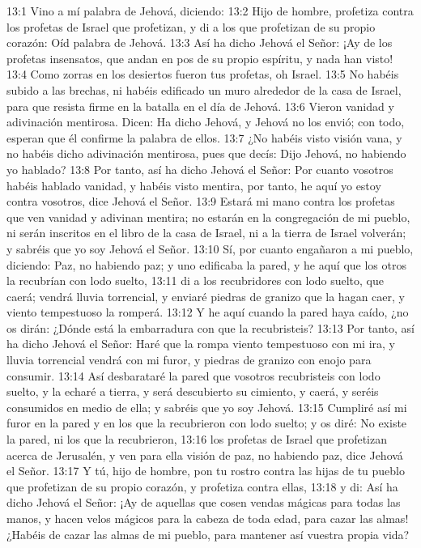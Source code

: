 13:1 Vino a mí palabra de Jehová, diciendo:   
13:2 Hijo de hombre, profetiza contra los profetas de Israel que profetizan, y di a los que profetizan de su propio corazón: Oíd palabra de Jehová.   
13:3 Así ha dicho Jehová el Señor: ¡Ay de los profetas insensatos, que andan en pos de su propio espíritu, y nada han visto!   
13:4 Como zorras en los desiertos fueron tus profetas, oh Israel.   
13:5 No habéis subido a las brechas, ni habéis edificado un muro alrededor de la casa de Israel, para que resista firme en la batalla en el día de Jehová.   
13:6 Vieron vanidad y adivinación mentirosa. Dicen: Ha dicho Jehová, y Jehová no los envió; con todo, esperan que él confirme la palabra de ellos.   
13:7 ¿No habéis visto visión vana, y no habéis dicho adivinación mentirosa, pues que decís: Dijo Jehová, no habiendo yo hablado?   
13:8 Por tanto, así ha dicho Jehová el Señor: Por cuanto vosotros habéis hablado vanidad, y habéis visto mentira, por tanto, he aquí yo estoy contra vosotros, dice Jehová el Señor.   
13:9 Estará mi mano contra los profetas que ven vanidad y adivinan mentira; no estarán en la congregación de mi pueblo, ni serán inscritos en el libro de la casa de Israel, ni a la tierra de Israel volverán; y sabréis que yo soy Jehová el Señor.   
13:10 Sí, por cuanto engañaron a mi pueblo, diciendo: Paz, no habiendo paz; y uno edificaba la pared, y he aquí que los otros la recubrían con lodo suelto,   
13:11 di a los recubridores con lodo suelto, que caerá; vendrá lluvia torrencial, y enviaré piedras de granizo que la hagan caer, y viento tempestuoso la romperá.   
13:12 Y he aquí cuando la pared haya caído, ¿no os dirán: ¿Dónde está la embarradura con que la recubristeis?   
13:13 Por tanto, así ha dicho Jehová el Señor: Haré que la rompa viento tempestuoso con mi ira, y lluvia torrencial vendrá con mi furor, y piedras de granizo con enojo para consumir.   
13:14 Así desbarataré la pared que vosotros recubristeis con lodo suelto, y la echaré a tierra, y será descubierto su cimiento, y caerá, y seréis consumidos en medio de ella; y sabréis que yo soy Jehová.   
13:15 Cumpliré así mi furor en la pared y en los que la recubrieron con lodo suelto; y os diré: No existe la pared, ni los que la recubrieron,   
13:16 los profetas de Israel que profetizan acerca de Jerusalén, y ven para ella visión de paz, no habiendo paz, dice Jehová el Señor.   
13:17 Y tú, hijo de hombre, pon tu rostro contra las hijas de tu pueblo que profetizan de su propio corazón, y profetiza contra ellas,   
13:18 y di: Así ha dicho Jehová el Señor: ¡Ay de aquellas que cosen vendas mágicas para todas las manos, y hacen velos mágicos para la cabeza de toda edad, para cazar las almas! ¿Habéis de cazar las almas de mi pueblo, para mantener así vuestra propia vida?   
